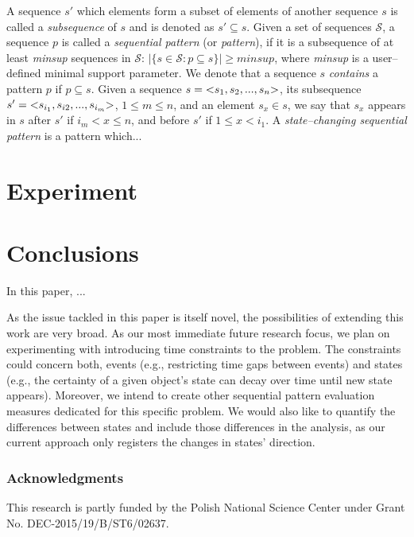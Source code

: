 \documentclass[runningheads,a4paper]{llncs}
\begin{document}
A sequence $s'$ which elements form a subset of elements of another sequence $s$ is called a \textit{subsequence} of $s$ and is denoted as $s'\subseteq s$.
Given a set of sequences $\mathcal{S}$, a sequence $p$ is called a \textit{sequential pattern} (or \textit{pattern}), if it is a subsequence of at least \textit{minsup} sequences in $\mathcal{S}$: $|\{s\in\mathcal{S}:p\subseteq s\}|\geq\textit{minsup}$, where \textit{minsup} is a user--defined minimal support parameter.
We denote that a sequence $s$ \textit{contains} a pattern $p$ if $p\subseteq s$.
Given a sequence $s=\text{\textless} s_1,s_2,...,s_n\text{\textgreater}$, its subsequence $s'=\text{\textless} s_{i_1}, s_{i2}, ..., s_{i_m}\text{\textgreater}$, $1\leq m\leq n$, and an element $s_x\in s$, we say that $s_x$ appears in $s$ after $s'$ if $i_m<x\leq n$, and before $s'$ if $1\leq x<i_1$.
A \textit{state--changing sequential pattern} is a pattern which...

\section{Experiment}
\label{sec:experiments}


\section{Conclusions}
\label{sec:conclusions}
In this paper, ...

As the issue tackled in this paper is itself novel, the possibilities of extending this work are very broad.
As our most immediate future research focus, we plan on experimenting with introducing time constraints to the problem.
The constraints could concern both, events (e.g., restricting time gaps between events) and states (e.g., the certainty of a given object's state can decay over time until new state appears).
Moreover, we intend to create other sequential pattern evaluation measures dedicated for this specific problem.
We would also like to quantify the differences between states and include those differences in the analysis, as our current approach only registers the changes in states' direction.

\subsubsection*{Acknowledgments} This research is partly funded by the Polish National Science Center under Grant No. DEC-2015/19/B/ST6/02637.



\end{document}
